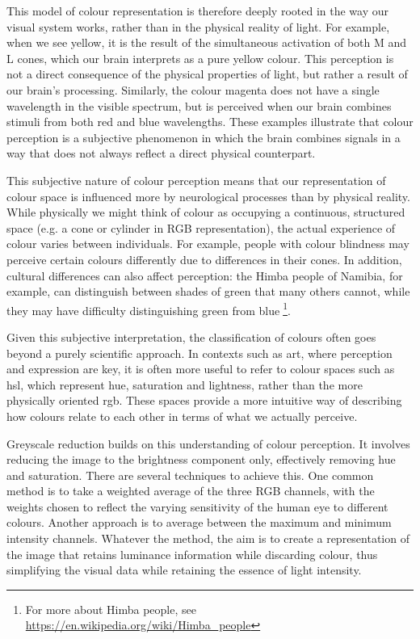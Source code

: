 \noindent This model of colour representation is therefore deeply rooted in the way our visual system works, rather than in the physical reality of light. For example, when we see yellow, it is the result of the simultaneous activation of both M and L cones, which our brain interprets as a pure yellow colour. This perception is not a direct consequence of the physical properties of light, but rather a result of our brain's processing. Similarly, the colour magenta does not have a single wavelength in the visible spectrum, but is perceived when our brain combines stimuli from both red and blue wavelengths. These examples illustrate that colour perception is a subjective phenomenon in which the brain combines signals in a way that does not always reflect a direct physical counterpart.

\noindent This subjective nature of colour perception means that our representation of colour space is influenced more by neurological processes than by physical reality. While physically we might think of colour as occupying a continuous, structured space (e.g. a cone or cylinder in RGB representation), the actual experience of colour varies between individuals. For example, people with colour blindness may perceive certain colours differently due to differences in their cones. In addition, cultural differences can also affect perception: the Himba people of Namibia, for example, can distinguish between shades of green that many others cannot, while they may have difficulty distinguishing green from blue\footnote{For more about Himba people, see \url{https://en.wikipedia.org/wiki/Himba_people}}.

\noindent Given this subjective interpretation, the classification of colours often goes beyond a purely scientific approach. In contexts such as art, where perception and expression are key, it is often more useful to refer to colour spaces such as \gls{hsl}, which represent hue, saturation and lightness, rather than the more physically oriented \gls{rgb}. These spaces provide a more intuitive way of describing how colours relate to each other in terms of what we actually perceive.

\noindent Greyscale reduction builds on this understanding of colour perception. It involves reducing the image to the brightness component only, effectively removing hue and saturation. There are several techniques to achieve this. One common method is to take a weighted average of the three RGB channels, with the weights chosen to reflect the varying sensitivity of the human eye to different colours. Another approach is to average between the maximum and minimum intensity channels. Whatever the method, the aim is to create a representation of the image that retains luminance information while discarding colour, thus simplifying the visual data while retaining the essence of light intensity.

